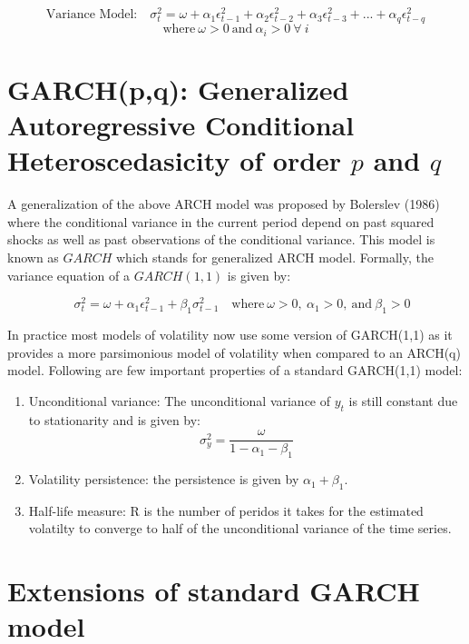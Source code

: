 \documentclass[]{book}
\theoremstyle{definition}
\theoremstyle{definition}
\theoremstyle{definition}
\theoremstyle{remark}
\begin{document}
\[\text{Variance Model:} \quad  \sigma_t^2=\omega +\alpha_1 \epsilon_{t-1}^2+\alpha_2 \epsilon_{t-2}^2 +\alpha_3 \epsilon_{t-3}^2 +...+ \alpha_q \epsilon_{t-q}^2 \]
\[\text{where} \ \omega>0 \ \text{and} \ \alpha_i>0 \ \forall \ i\]

\hypertarget{garchpq-generalized-autoregressive-conditional-heteroscedasicity-of-order-p-and-q}{%
\section{\texorpdfstring{GARCH(p,q): Generalized Autoregressive
Conditional Heteroscedasicity of order \(p\) and
\(q\)}{GARCH(p,q): Generalized Autoregressive Conditional Heteroscedasicity of order p and q}}\label{garchpq-generalized-autoregressive-conditional-heteroscedasicity-of-order-p-and-q}}

A generalization of the above ARCH model was proposed by Bolerslev
(1986) where the conditional variance in the current period depend on
past squared shocks as well as past observations of the conditional
variance. This model is known as \(GARCH\) which stands for generalized
ARCH model. Formally, the variance equation of a \(GARCH(1,1)\) is given
by:

\[\quad  \sigma_t^2=\omega +\alpha_1 \epsilon_{t-1}^2 +\beta_1 \sigma^2_{t-1} \quad \text{where} \ \omega>0, \ \alpha_1>0, \ \text{and} \ \beta_1>0 \]

In practice most models of volatility now use some version of GARCH(1,1)
as it provides a more parsimonious model of volatility when compared to
an ARCH(q) model. Following are few important properties of a standard
GARCH(1,1) model:

\begin{enumerate}
\def\labelenumi{\roman{enumi}.}
\item
  Unconditional variance: The unconditional variance of \(y_t\) is still
  constant due to stationarity and is given by:
  \[\sigma^2_y = \frac{\omega}{1-\alpha_1-\beta_1}\]
\item
  Volatility persistence: the persistence is given by
  \(\alpha_1+\beta_1\).
\item
  Half-life measure: R is the number of peridos it takes for the
  estimated volatilty to converge to half of the unconditional variance
  of the time series.
\end{enumerate}

\hypertarget{extensions-of-standard-garch-model}{%
\section{Extensions of standard GARCH
model}\label{extensions-of-standard-garch-model}}
\end{document}
